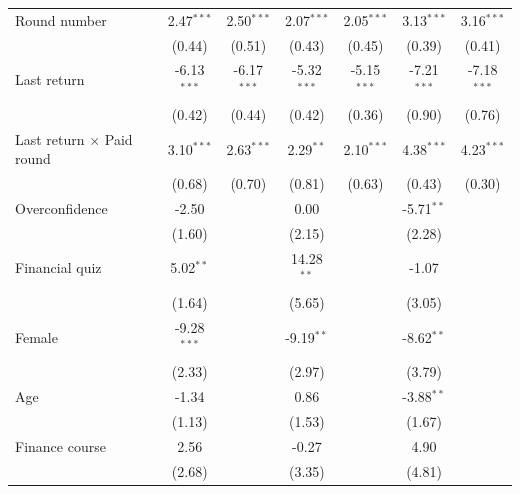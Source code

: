 \begin{tabular}{lcccccc}
   Round number                         & 2.47$^{***}$  & 2.50$^{***}$  & 2.07$^{***}$  & 2.05$^{***}$  & 3.13$^{***}$  & 3.16$^{***}$\\   
                                        & (0.44)        & (0.51)        & (0.43)        & (0.45)        & (0.39)        & (0.41)\\   
   Last return                          & -6.13$^{***}$ & -6.17$^{***}$ & -5.32$^{***}$ & -5.15$^{***}$ & -7.21$^{***}$ & -7.18$^{***}$\\   
                                        & (0.42)        & (0.44)        & (0.42)        & (0.36)        & (0.90)        & (0.76)\\   
   Last return $\times$ Paid round      & 3.10$^{***}$  & 2.63$^{***}$  & 2.29$^{**}$   & 2.10$^{***}$  & 4.38$^{***}$  & 4.23$^{***}$\\   
                                        & (0.68)        & (0.70)        & (0.81)        & (0.63)        & (0.43)        & (0.30)\\   
   Overconfidence                       & -2.50         &               & 0.00          &               & -5.71$^{**}$  &   \\   
                                        & (1.60)        &               & (2.15)        &               & (2.28)        &   \\   
   Financial quiz                       & 5.02$^{**}$   &               & 14.28$^{**}$  &               & -1.07         &   \\   
                                        & (1.64)        &               & (5.65)        &               & (3.05)        &   \\   
   Female                               & -9.28$^{***}$ &               & -9.19$^{**}$  &               & -8.62$^{**}$  &   \\   
                                        & (2.33)        &               & (2.97)        &               & (3.79)        &   \\   
   Age                                  & -1.34         &               & 0.86          &               & -3.88$^{**}$  &   \\   
                                        & (1.13)        &               & (1.53)        &               & (1.67)        &   \\   
   Finance course                       & 2.56          &               & -0.27         &               & 4.90          &   \\   
                                        & (2.68)        &               & (3.35)        &               & (4.81)        &   \\   

\end{tabular}

